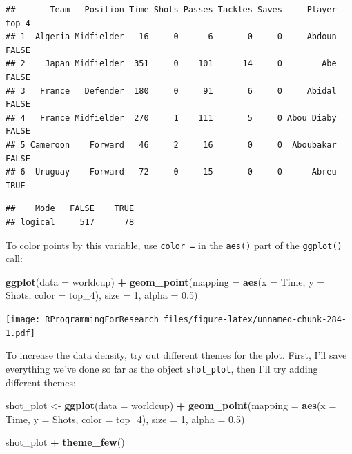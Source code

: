 \documentclass[]{book}
\makeatletter
\newenvironment{Shaded}{\begin{snugshade}}{\end{snugshade}}
\newcommand{\KeywordTok}[1]{\textcolor[rgb]{0.13,0.29,0.53}{\textbf{#1}}}
\newcommand{\DataTypeTok}[1]{\textcolor[rgb]{0.13,0.29,0.53}{#1}}
\newcommand{\DecValTok}[1]{\textcolor[rgb]{0.00,0.00,0.81}{#1}}
\newcommand{\FloatTok}[1]{\textcolor[rgb]{0.00,0.00,0.81}{#1}}
\newcommand{\StringTok}[1]{\textcolor[rgb]{0.31,0.60,0.02}{#1}}
\newcommand{\OperatorTok}[1]{\textcolor[rgb]{0.81,0.36,0.00}{\textbf{#1}}}
\newcommand{\NormalTok}[1]{#1}
\newenvironment{kframe}{%
\medskip{}
\setlength{\fboxsep}{.8em}
 \def\at@end@of@kframe{}%
 \ifinner\ifhmode%
  \def\at@end@of@kframe{\end{minipage}}%
  \begin{minipage}{\columnwidth}%
 \fi\fi%
 \def\FrameCommand##1{\hskip\@totalleftmargin \hskip-\fboxsep
 \colorbox{shadecolor}{##1}\hskip-\fboxsep
     \hskip-\linewidth \hskip-\@totalleftmargin \hskip\columnwidth}%
 \MakeFramed {\advance\hsize-\width
   \@totalleftmargin\z@ \linewidth\hsize
   \@setminipage}}%
 {\par\unskip\endMakeFramed%
 \at@end@of@kframe}
\renewenvironment{Shaded}{\begin{kframe}}{\end{kframe}}
\theoremstyle{definition}
\theoremstyle{definition}
\theoremstyle{definition}
\theoremstyle{remark}
\makeatother
\begin{document}
\begin{verbatim}
##       Team   Position Time Shots Passes Tackles Saves     Player top_4
## 1  Algeria Midfielder   16     0      6       0     0     Abdoun FALSE
## 2    Japan Midfielder  351     0    101      14     0        Abe FALSE
## 3   France   Defender  180     0     91       6     0     Abidal FALSE
## 4   France Midfielder  270     1    111       5     0 Abou Diaby FALSE
## 5 Cameroon    Forward   46     2     16       0     0  Aboubakar FALSE
## 6  Uruguay    Forward   72     0     15       0     0      Abreu  TRUE
\end{verbatim}

\begin{Shaded}
\end{Shaded}

\begin{verbatim}
##    Mode   FALSE    TRUE 
## logical     517      78
\end{verbatim}

To color points by this variable, use \texttt{color\ =} in the
\texttt{aes()} part of the \texttt{ggplot()} call:

\begin{Shaded}
\begin{Highlighting}[]
\KeywordTok{ggplot}\NormalTok{(}\DataTypeTok{data =}\NormalTok{ worldcup) }\OperatorTok{+}
\StringTok{        }\KeywordTok{geom_point}\NormalTok{(}\DataTypeTok{mapping =} \KeywordTok{aes}\NormalTok{(}\DataTypeTok{x =}\NormalTok{ Time, }\DataTypeTok{y =}\NormalTok{ Shots, }\DataTypeTok{color =}\NormalTok{ top_}\DecValTok{4}\NormalTok{),}
                   \DataTypeTok{size =} \DecValTok{1}\NormalTok{, }\DataTypeTok{alpha =} \FloatTok{0.5}\NormalTok{)}
\end{Highlighting}
\end{Shaded}

\texttt{[image: RProgrammingForResearch\_files/figure-latex/unnamed-chunk-284-1.pdf]}

To increase the data density, try out different themes for the plot.
First, I'll save everything we've done so far as the object
\texttt{shot\_plot}, then I'll try adding different themes:

\begin{Shaded}
\begin{Highlighting}[]
\NormalTok{shot_plot <-}\StringTok{ }\KeywordTok{ggplot}\NormalTok{(}\DataTypeTok{data =}\NormalTok{ worldcup) }\OperatorTok{+}
\StringTok{        }\KeywordTok{geom_point}\NormalTok{(}\DataTypeTok{mapping =} \KeywordTok{aes}\NormalTok{(}\DataTypeTok{x =}\NormalTok{ Time, }\DataTypeTok{y =}\NormalTok{ Shots, }\DataTypeTok{color =}\NormalTok{ top_}\DecValTok{4}\NormalTok{),}
                   \DataTypeTok{size =} \DecValTok{1}\NormalTok{, }\DataTypeTok{alpha =} \FloatTok{0.5}\NormalTok{)}

\NormalTok{shot_plot }\OperatorTok{+}\StringTok{ }\KeywordTok{theme_few}\NormalTok{()}
\end{Highlighting}
\end{Shaded}
\end{document}
